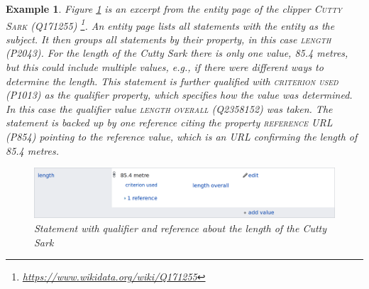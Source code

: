 \documentclass[hyperref,bachelorofscience,fleqn]{cgvpub}
\newtheorem{example}{Example}
\begin{document}
\begin{example}
Figure \ref{fig_example} is an excerpt from the entity page of the clipper \textsc{Cutty Sark} (Q171255) \footnote{\url{https://www.wikidata.org/wiki/Q171255}}. An entity page lists all statements with the entity as the subject. It then groups all statements by their property, in this case \textsc{length} (P2043). For the length of the Cutty Sark there is only one value, 85.4 metres, but this could include multiple values, e.g., if there were different ways to determine the length. This statement is further qualified with \textsc{criterion used} (P1013) as the qualifier property, which specifies how the value was determined. In this case the qualifier value \textsc{length overall} (Q2358152) was taken. The statement is backed up by one reference citing the property \textsc{reference URL} (P854) pointing to the reference value, which is an URL confirming the length of 85.4 metres.

\begin{figure}[H]
\includegraphics[width=\linewidth]{images/cutty_sark_length.png}
\caption{Statement with qualifier and reference about the length of the Cutty Sark}\label{fig_example}
\end{figure}
\end{example}
\end{document}
